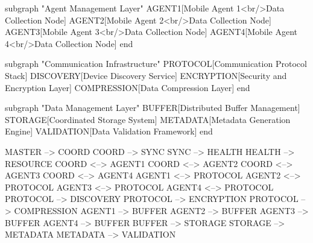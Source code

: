 \documentclass[11pt,a4paper]{report}
\begin{document}
    subgraph "Agent Management Layer"
        AGENT1[Mobile Agent 1<br/>Data Collection Node]
        AGENT2[Mobile Agent 2<br/>Data Collection Node]
        AGENT3[Mobile Agent 3<br/>Data Collection Node]
        AGENT4[Mobile Agent 4<br/>Data Collection Node]
    end

    subgraph "Communication Infrastructure"
        PROTOCOL[Communication Protocol Stack]
        DISCOVERY[Device Discovery Service]
        ENCRYPTION[Security and Encryption Layer]
        COMPRESSION[Data Compression Layer]
    end

    subgraph "Data Management Layer"
        BUFFER[Distributed Buffer Management]
        STORAGE[Coordinated Storage System]
        METADATA[Metadata Generation Engine]
        VALIDATION[Data Validation Framework]
    end

    MASTER --> COORD
    COORD --> SYNC
    SYNC --> HEALTH
    HEALTH --> RESOURCE
    COORD <--> AGENT1
    COORD <--> AGENT2
    COORD <--> AGENT3
    COORD <--> AGENT4
    AGENT1 <--> PROTOCOL
    AGENT2 <--> PROTOCOL
    AGENT3 <--> PROTOCOL
    AGENT4 <--> PROTOCOL
    PROTOCOL --> DISCOVERY
    PROTOCOL --> ENCRYPTION
    PROTOCOL --> COMPRESSION
    AGENT1 --> BUFFER
    AGENT2 --> BUFFER
    AGENT3 --> BUFFER
    AGENT4 --> BUFFER
    BUFFER --> STORAGE
    STORAGE --> METADATA
    METADATA --> VALIDATION
\end{document}
